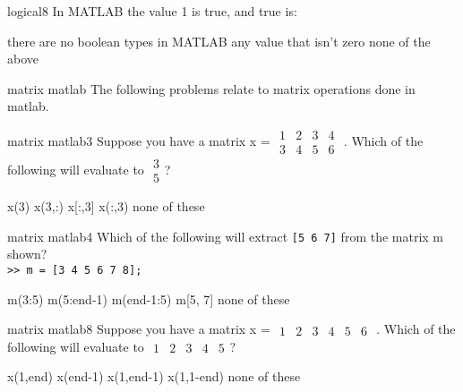 \documentclass{exam}
\begin{document}
\begin{problem}[requires=logical]{logical}{8} 
  In MATLAB the value 1 is true, and true is:
  \begin{answers} 
    \answer there are no boolean types in MATLAB
    \answer[correct] any value that isn't zero %
    \answer[fixed] none of the above %
  \end{answers}
\end{problem}

\begin{block}{matrix matlab}
The following problems relate to matrix operations done in matlab.
\end{block}

\begin{problem}[requires=matrix matlab]{matrix matlab}{3}
 Suppose you have a matrix x = \footnotesize
$\begin{array}{cccc}1 & 2 & 3 & 4\\3 & 4 & 5 & 6\end{array}$
\normalsize. Which of the following will evaluate to \footnotesize
$\begin{array}{c}3 \\ 5\end{array}$\normalsize?
  \begin{answers}   
    \answer x(3)
    \answer x(3,:)
    \answer x[:,3]
    \answer[correct] x(:,3) %
    \answer[fixed] none of these %
   \end{answers}
\end{problem}

\begin{problem}[requires=matrix matlab]{matrix matlab}{4} 
  Which of the following will extract \texttt{[5 6 7]} from the matrix m
  shown?\\
\texttt{>> m = [3 4 5 6 7 8];
}
  \begin{answers}
    \answer[correct] m(3:5) %
    \answer m(5:end-1)
    \answer m(end-1:5)
    \answer m[5, 7]
    \answer[fixed] none of these %
  \end{answers}
\end{problem}


\begin{problem}[requires=matrix matlab]{matrix matlab}{8}
  Suppose you have a matrix x = \footnotesize
  $\begin{array}{cccccc}1 & 2 & 3 & 4 & 5 & 6 \end{array}$
  \normalsize. Which of the following will evaluate to \footnotesize
  $\begin{array}{cccccc}1 & 2 & 3 & 4 & 5 \end{array}$\normalsize?
  \begin{answers}   
    \answer x(1,end)  
    \answer x(end-1)  
    \answer[correct] x(1,end-1) %
    \answer x(1,1-end)
    \answer[fixed] none of these %
  \end{answers}
\end{problem}
\end{document}
